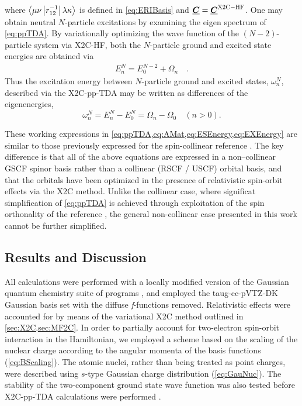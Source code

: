 where $\left\langle \mu\nu \left\vert r^{-1}_{12} \right\vert \lambda\kappa \right\rangle$ is defined in \cref{eq:ERIBasis} and $\boldsymbol{\underline{C}} = \boldsymbol{\underline{C}}^\mathrm{X2C-HF}$. 
One may obtain neutral $N$-particle excitations by examining the eigen spectrum of \cref{eq:ppTDA}. By
variationally optimizing the wave function of the $(N-2)$-particle system via
X2C-HF, both the $N$-particle ground and excited state energies are obtained
via
\begin{align}
E_n^N = E_0^{N-2} + \Omega_n \quad . \label{eq:ESEnergy}
\end{align}
Thus the excitation energy between $N$-particle ground and excited states, $\omega_n^N$, described via the X2C-pp-TDA may be written as differences of the eigenenergies,
\begin{equation}
\omega_n^N = E_n^N - E_0^N = \Omega_n - \Omega_0 \quad (n > 0). \label{eq:EXEnergy}
\end{equation}

These working expressions in \cref{eq:ppTDA,eq:AMat,eq:ESEnergy,eq:EXEnergy}
are similar to those previously expressed for the spin-collinear
reference \cite{Yang13_224105,Yang13_18A522,Yang13_104112}. The key difference
is that all of the above equations are expressed in a non--collinear GSCF spinor 
basis rather than a collinear (RSCF / USCF) orbital basis, and that the
orbitals have been optimized in the presence of relativistic spin-orbit
effects via the X2C method.
Unlike the collinear case, where significat simplification of \cref{eq:ppTDA} is
achieved through exploitation of the spin orthonality of the reference 
\cite{Yang13_224105,Yang13_174110}, the general non-collinear case presented in this
work cannot be further simplified.

\subsection{Results and Discussion}
\label{sec:ppX2CResults}

All calculations were performed with a locally modified version of the Gaussian
quantum chemistry suite of programs \cite{GDVI06}, and employed the
taug-cc-pVTZ-DK Gaussian basis set \cite{Dixon01_48} with the diffuse \emph{f}-functions
removed.  Relativistic effects were accounted for by means of the variational
X2C method outlined in \cref{sec:X2C,sec:MF2C}.
In order
to partially account for two-electron spin-orbit interaction in the
Hamiltonian, we employed a scheme based on the scaling of the nuclear charge
according to the angular momenta of the basis functions (\cref{eq:BScaling}). The atomic nuclei,
rather than being treated as point charges, were described using $s$-type
Gaussian charge distribution (\cref{eq:GauNuc}). The stability of the
two-component ground state wave function was also tested before X2C-pp-TDA
calculations were performed \cite{Li15_154109}.

